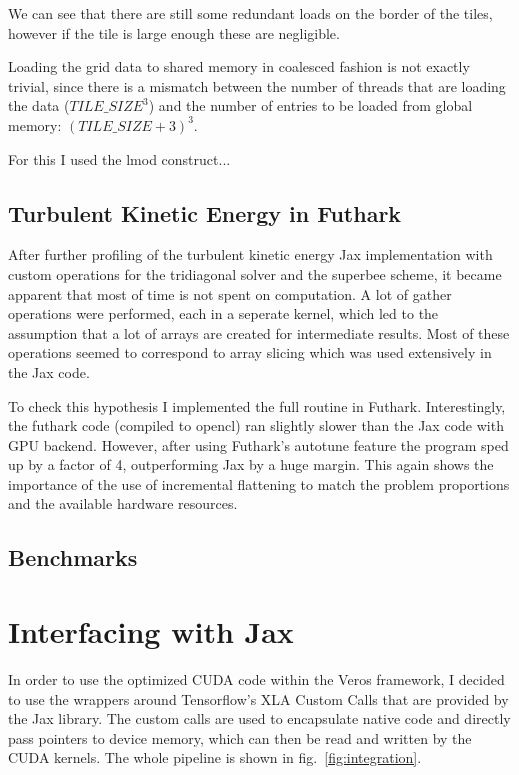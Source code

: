 \documentclass[a4paper,oneside]{memoir}
\begin{document}
We can see that there are still some redundant loads on the border of the tiles, however if the tile is large enough these are negligible. 

Loading the grid data to shared memory in coalesced fashion is not exactly trivial, since there is a mismatch between the number of threads that are loading the data ($TILE\_SIZE^3$) and the number of entries to be loaded from global memory: $(TILE\_SIZE+3)^3$.

For this I used the lmod construct... 

\subsection{Turbulent Kinetic Energy in Futhark}
After further profiling of the turbulent kinetic energy Jax implementation with custom operations for the tridiagonal solver and the superbee scheme, it became apparent that most of time is not spent on computation. A lot of gather operations were performed, each in a seperate kernel, which led to the assumption that a lot of arrays are created for intermediate results. Most of these operations seemed to correspond to array slicing which was used extensively in the Jax code. 

To check this hypothesis I implemented the full routine in Futhark. 
Interestingly, the futhark code (compiled to opencl) ran slightly slower than the Jax code with GPU backend. However, after using Futhark's autotune feature the program sped up by a factor of 4, outperforming Jax by a huge margin. This again shows the importance of the use of incremental flattening to match the problem proportions and the available hardware resources.


\subsection{Benchmarks}
\section{Interfacing with Jax}
\label{sec:integrate}
In order to use the optimized CUDA code within the Veros framework, I decided to use the wrappers around Tensorflow's \cite{tensorflow} XLA Custom Calls that are provided by the Jax library. The custom calls are used to encapsulate native code and directly pass pointers to device memory, which can then be read and written by the CUDA kernels. The whole pipeline is shown in fig.~\ref{fig:integration}.
\end{document}
